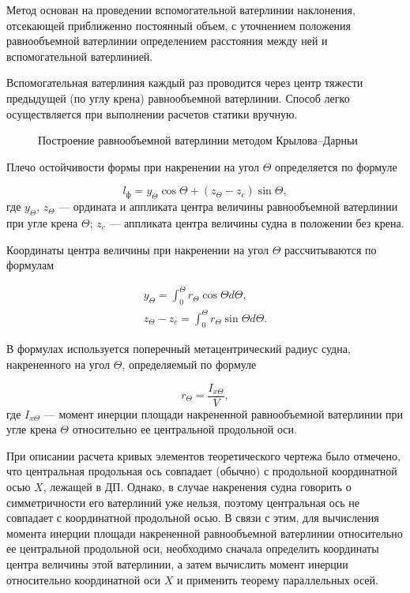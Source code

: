 Метод основан на проведении вспомогательной ватерлинии наклонения, отсекающей приближенно постоянный объем, с уточнением положения равнообъемной ватерлинии определением расстояния между ней и вспомогательной ватерлинией.

Вспомогательная ватерлиния каждый раз проводится через центр тяжести предыдущей (по углу крена) равнообъемной ватерлинии. Способ легко осуществляется при выполнении расчетов статики вручную.

\begin{figure}[h!]
    \centerline{}
    \caption{Построение равнообъемной ватерлинии методом Крылова–Дарньи}
    \label{fig:kryloff-darny}
\end{figure}

Плечо остойчивости формы при накренении на угол $\Theta$ определяется по формуле

\begin{equation}
    l_{\text{ф}} = y_{\Theta} \cos \Theta + (z_{\Theta} - z_c) \sin \Theta,
    \label{eq:form_stability_arm}
\end{equation}
где $y_{\Theta}$, $z_{\Theta}$ --- ордината и аппликата центра величины равнообъемной ватерлинии при угле крена $\Theta$;
$z_c$ --- аппликата центра величины судна в положении без крена.

Координаты центра величины при накренении на угол $\Theta$ рассчитываются по формулам

\begin{equation}
    \begin{split}
    y_{\Theta} = \int_0^{\Theta} r_{\Theta} \cos \Theta d\Theta, \\
    z_{\Theta} -z_c = \int_0^{\Theta} r_{\Theta} \sin \Theta d\Theta .
    \end{split}
\end{equation}

В формулах используется поперечный метацентрический радиус судна, накрененного на угол $\Theta$, определяемый по формуле

\begin{equation}
    r_{\Theta} = \frac{I_{x\Theta}}{V},
\end{equation}
где $I_{x\Theta}$ --- момент инерции площади накрененной равнообъемной ватерлинии при угле крена $\Theta$ относительно ее центральной продольной оси.

При описании расчета кривых элементов теоретического чертежа было отмечено, что центральная продольная ось совпадает (обычно) с продольной координатной осью $X$, лежащей в ДП.
Однако, в случае накренения судна говорить о симметричности его ватерлиний уже нельзя, поэтому центральная ось не совпадает с координатной продольной осью.
В связи с этим, для вычисления момента инерции площади накрененной равнообъемной ватерлинии относительно ее центральной продольной оси, необходимо сначала определить координаты центра величины этой ватерлинии, а затем вычислить момент инерции относительно координатной оси $X$ и применить теорему параллельных осей.

